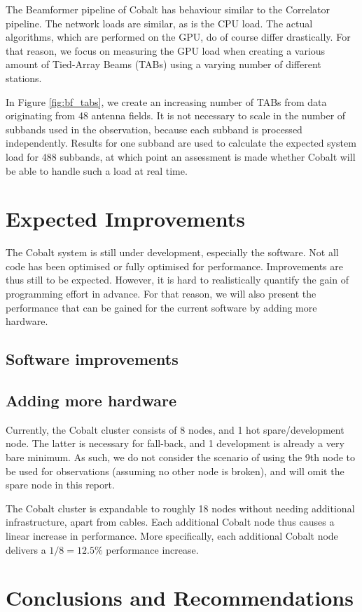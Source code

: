 \documentclass{report}
\begin{document}
The Beamformer pipeline of Cobalt has behaviour similar to the Correlator pipeline. The network loads are similar, as is the CPU load. The actual algorithms, which are performed on the GPU, do of course differ drastically. For that reason, we focus on measuring the GPU load when creating a various amount of Tied-Array Beams (TABs) using a varying number of different stations.

In Figure \ref{fig:bf_tabs}, we create an increasing number of TABs from data originating from 48 antenna fields. It is not necessary to scale in the number of subbands used in the observation, because each subband is processed independently. Results for one subband are used to calculate the expected system load for 488 subbands, at which point an assessment is made whether Cobalt will be able to handle such a load at real time.

\section{Expected Improvements}

The Cobalt system is still under development, especially the software. Not all code has been optimised or fully optimised for performance. Improvements are thus still to be expected. However, it is hard to realistically quantify the gain of programming effort in advance. For that reason, we will also present the performance that can be gained for the current software by adding more hardware.

\subsection{Software improvements}
\subsection{Adding more hardware}

Currently, the Cobalt cluster consists of 8 nodes, and 1 hot spare/development node. The latter is necessary for fall-back, and 1 development is already a very bare minimum. As such, we do not consider the scenario of using the 9th node to be used for observations (assuming no other node is broken), and will omit the spare node in this report.

The Cobalt cluster is expandable to roughly 18 nodes without needing additional infrastructure, apart from cables. Each additional Cobalt node thus causes a linear increase in performance. More specifically, each additional Cobalt node delivers a $1/8=12.5\%$ performance increase.

\section{Conclusions and Recommendations}
\end{document}
